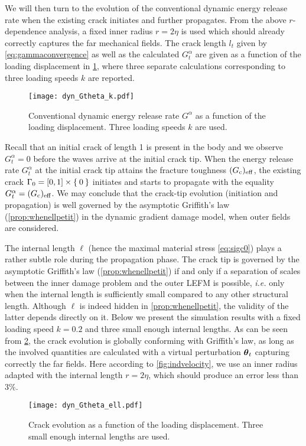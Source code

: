 We will then turn to the evolution of the conventional dynamic energy release rate when the existing crack initiates and further propagates. From the above $r$-dependence analysis, a fixed inner radius $r=2\eta$ is used which should already correctly captures the far mechanical fields. The crack length $l_t$ given by \eqref{eq:gammaconvergence} as well as the calculated $G^\alpha_t$ are given as a function of the loading displacement in \cref{fig:evoGtGc}, where three separate calculations corresponding to three loading speeds $k$ are reported.
\begin{figure}[htbp]
\centering
\texttt{[image: dyn\_Gtheta\_k.pdf]}
\caption{Conventional dynamic energy release rate $G^\alpha$ as a function of the loading displacement. Three loading speeds $k$ are used.} \label{fig:evoGtGc}
\end{figure}
Recall that an initial crack of length 1 is present in the body and we observe $G^\alpha_t=0$ before the waves arrive at the initial crack tip. When the energy release rate $G^\alpha_t$ at the initial crack tip attains the fracture toughness $(G_\mathrm{c})_\mathrm{eff}$, the existing crack $\Gamma_0=[0,1]\times\Set{0}$ initiates and starts to propagate with the equality $G^\alpha_t=(G_\mathrm{c})_\mathrm{eff}$. We may conclude that the crack-tip evolution (initiation and propagation) is well governed by the asymptotic Griffith's law (\cref{prop:whenellpetit}) in the dynamic gradient damage model, when outer fields are considered.

The internal length $\ell$ (hence the maximal material stress \eqref{eq:sigc0}) plays a rather subtle role during the propagation phase. The crack tip is governed by the asymptotic Griffith's law (\cref{prop:whenellpetit}) if and only if a separation of scales between the inner damage problem and the outer LEFM is possible, \emph{i.e.} only when the internal length is sufficiently small compared to any other structural length. Although $\ell$ is indeed hidden in \cref{prop:whenellpetit}, the validity of the latter depends directly on it. Below we present the simulation results with a fixed loading speed $k=0.2$ and three small enough internal lengths. As can be seen from \cref{fig:evoGtGcell}, the crack evolution is globally conforming with Griffith's law, as long as the involved quantities are calculated with a virtual perturbation $\vtheta_t$ capturing correctly the far fields. Here according to \cref{fig:indvelocity}, we use an inner radius adapted with the internal length $r=2\eta$, which should produce an error less than $3\%$.
\begin{figure}[htbp]
\centering
\texttt{[image: dyn\_Gtheta\_ell.pdf]}
\caption{Crack evolution as a function of the loading displacement. Three small enough internal lengths are used.} \label{fig:evoGtGcell}
\end{figure}


